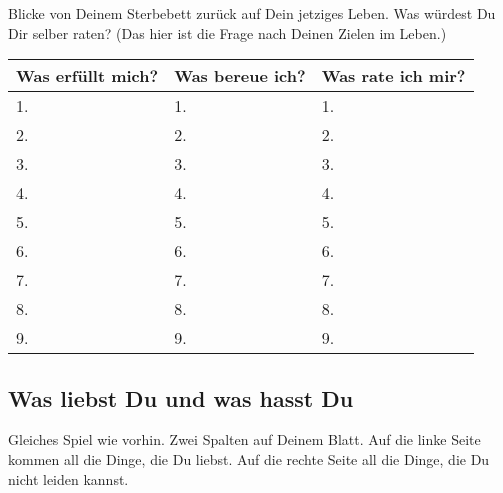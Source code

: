 \documentclass[../Lebensziel.tex]{subfiles}
\begin{document}
Blicke von Deinem Sterbebett zurück auf Dein jetziges Leben. Was würdest Du Dir selber raten?
(Das hier ist die Frage nach Deinen Zielen im Leben.)

\begin{table}[h!]
    \centering
    \setlength{\tabcolsep}{18pt}
    \renewcommand{\arraystretch}{2}
    \begin{tabular}{p{3.3cm}|p{3.3cm}|p{3.3cm}}
        Was erfüllt mich? & Was bereue ich? & Was rate ich mir? \\\hline
        1.                & 1.              & 1.                \\\hline
        2.                & 2.              & 2.                \\\hline
        3.                & 3.              & 3.                \\\hline
        4.                & 4.              & 4.                \\\hline
        5.                & 5.              & 5.                \\\hline
        6.                & 6.              & 6.                \\\hline
        7.                & 7.              & 7.                \\\hline
        8.                & 8.              & 8.                \\\hline
        9.                & 9.              & 9.
    \end{tabular}
    \label{sterbebett}
\end{table}

\subsection*{Was liebst Du und was hasst Du}
Gleiches Spiel wie vorhin.
Zwei Spalten auf Deinem Blatt. Auf die linke Seite kommen all die Dinge, die Du liebst. Auf die rechte Seite all die Dinge, die Du nicht leiden kannst.
\end{document}
